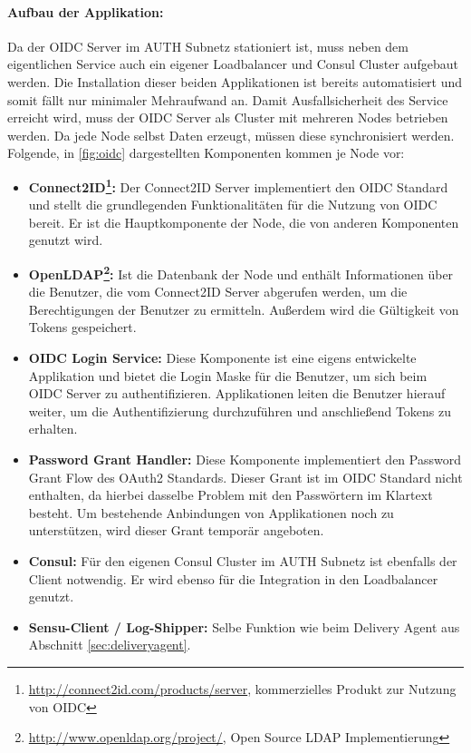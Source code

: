 \paragraph{Aufbau der Applikation:}
Da der OIDC Server im AUTH Subnetz stationiert ist, muss neben dem eigentlichen Service auch ein eigener Loadbalancer und Consul Cluster aufgebaut werden. Die Installation dieser beiden Applikationen ist bereits automatisiert und somit fällt nur minimaler Mehraufwand an. Damit Ausfallsicherheit des Service erreicht wird, muss der OIDC Server als Cluster mit mehreren Nodes betrieben werden. Da jede Node selbst Daten erzeugt, müssen diese synchronisiert werden. Folgende, in \autoref{fig:oidc} dargestellten Komponenten kommen je Node vor:

\begin{itemize}
	\item \textbf{Connect2ID\footnote{\url{http://connect2id.com/products/server}, kommerzielles Produkt zur Nutzung von OIDC}:} Der Connect2ID Server implementiert den OIDC Standard und stellt die grundlegenden Funktionalitäten für die Nutzung von OIDC bereit. Er ist die Hauptkomponente der Node, die von anderen Komponenten genutzt wird.
	\item \textbf{OpenLDAP\footnote{\url{http://www.openldap.org/project/}, Open Source LDAP Implementierung}:} Ist die Datenbank der Node und enthält Informationen über die Benutzer, die vom Connect2ID Server abgerufen werden, um die Berechtigungen der Benutzer zu ermitteln. Außerdem wird die Gültigkeit von Tokens gespeichert.
	\item \textbf{OIDC Login Service:} Diese Komponente ist eine eigens entwickelte Applikation und bietet die Login Maske für die Benutzer, um sich beim OIDC Server zu authentifizieren. Applikationen leiten die Benutzer hierauf weiter, um die Authentifizierung durchzuführen und anschließend Tokens zu erhalten.
	\item \textbf{Password Grant Handler:} Diese Komponente implementiert den Password Grant Flow des OAuth2 Standards. Dieser Grant ist im OIDC Standard nicht enthalten, da hierbei dasselbe Problem mit den Passwörtern im Klartext besteht. Um bestehende Anbindungen von Applikationen noch zu unterstützen, wird dieser Grant temporär angeboten.
	\item \textbf{Consul:} Für den eigenen Consul Cluster im AUTH Subnetz ist ebenfalls der Client notwendig. Er wird ebenso für die Integration in den Loadbalancer genutzt.
	\item \textbf{Sensu-Client / Log-Shipper:} Selbe Funktion wie beim Delivery Agent aus Abschnitt \ref{sec:deliveryagent}.
\end{itemize}

